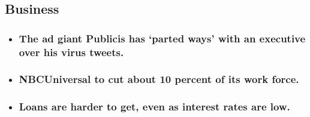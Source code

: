 \begin{itemize}
  \hypertarget{business}{%
  \subsection{Business}\label{business}}

  \begin{itemize}
  \item
    \href{https://www.nytimes3xbfgragh.onion/live/2020/08/04/business/stock-market-today-coronavirus?type=styln-live-updates\&label=business\&index=1\#the-ad-giant-publicis-has-parted-ways-with-an-executive-over-his-virus-tweets}{}

    \hypertarget{the-ad-giant-publicis-has-parted-ways-with-an-executive-over-his-virus-tweets}{%
    \subsubsection{The ad giant Publicis has `parted ways' with an
    executive over his virus
    tweets.}\label{the-ad-giant-publicis-has-parted-ways-with-an-executive-over-his-virus-tweets}}
  \item
    \href{https://www.nytimes3xbfgragh.onion/live/2020/08/04/business/stock-market-today-coronavirus?type=styln-live-updates\&label=business\&index=1\#nbcuniversal-to-cut-about-10-percent-of-its-work-force}{}

    \hypertarget{nbcuniversal-to-cut-about-10-percent-of-its-work-force}{%
    \subsubsection{NBCUniversal to cut about 10 percent of its work
    force.}\label{nbcuniversal-to-cut-about-10-percent-of-its-work-force}}
  \item
    \href{https://www.nytimes3xbfgragh.onion/live/2020/08/04/business/stock-market-today-coronavirus?type=styln-live-updates\&label=business\&index=1\#loans-are-harder-to-get-even-as-interest-rates-are-low}{}

    \hypertarget{loans-are-harder-to-get-even-as-interest-rates-are-low}{%
    \subsubsection{Loans are harder to get, even as interest rates are
    low.}\label{loans-are-harder-to-get-even-as-interest-rates-are-low}}
  \end{itemize}
\end{itemize}

